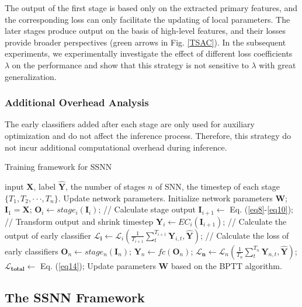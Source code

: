 \documentclass[letterpaper]{article} %
\begin{document}
The output of the first stage is based only on the extracted primary features, and the corresponding loss can only facilitate the updating of local parameters. The later stages produce output on the basis of high-level features, and their losses provide broader perspectives (green arrows in Fig. \ref{TSAC}). In the subsequent experiments, we experimentally investigate the effect of different loss coefficients $\lambda$ on the performance and show that this strategy is not sensitive to $\lambda$ with great generalization.

\subsubsection{Additional Overhead Analysis}
The early classifiers added after each stage are only used for auxiliary optimization and do not affect the inference process. Therefore, this strategy do not incur additional computational overhead during inference.
\begin{algorithm}[tb]
\caption{Training framework for SSNN}
\label{alg1}
\begin{algorithmic}[1]
\REQUIRE input $\boldsymbol{X}$, label $\hat{\boldsymbol{Y}}$, the number of stages $n$ of SNN, the timestep of each stage $\{T_1,T_2,\cdot \cdot \cdot, T_n\}$.
\ENSURE Update network parameters.
\STATE Initialize network parameters $\boldsymbol{W}$;
\STATE $\boldsymbol{I}_1=\boldsymbol{X}$;
\STATE $\boldsymbol{O}_i \leftarrow stage_i(\boldsymbol{I}_i)$; // Calculate stage output
\STATE $\boldsymbol{I}_{i+1} \leftarrow$ Eq. (\ref{eq8}-\ref{eq10}); // Transform output and shrink timestep
\STATE $\boldsymbol{Y}_{i} \leftarrow EC_i(\boldsymbol{I}_{i+1})$; // Calculate the output of early classifier
\STATE $\boldsymbol{\mathcal{L}_{i}} \leftarrow \boldsymbol{\mathcal{L}}_i(\frac{1}{T_{i+1}}\sum_t^{T_{i+1}} \boldsymbol{Y}_{i,t},\hat{\boldsymbol{Y}})$; // Calculate the loss of early classifiers
\ENDFOR
\STATE $\boldsymbol{O}_n \leftarrow stage_n(\boldsymbol{I}_{n})$;
\STATE $\boldsymbol{Y}_n \leftarrow fc(\boldsymbol{O}_n)$;
\STATE $\boldsymbol{\mathcal{L}_{n}} \leftarrow \boldsymbol{\mathcal{L}}_n(\frac{1}{T_n}\sum_t^{T_n} \boldsymbol{Y}_{n,t},\hat{\boldsymbol{Y}})$;
\STATE $\boldsymbol{\mathcal{L}_{total}} \leftarrow$ Eq. (\ref{eq14});
\STATE Update parameters $\boldsymbol{W}$ based on the BPTT algorithm.
\end{algorithmic}
\end{algorithm}
\subsection{The SSNN Framework}
\end{document}

